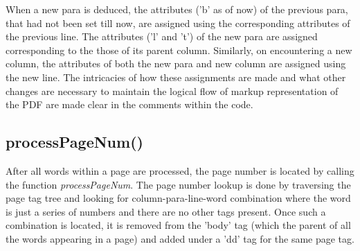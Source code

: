 When a new para is deduced, the attributes ('b' as of now) of the previous para, that had not been set till now, are assigned using the corresponding attributes of the previous line.
The attributes ('l' and 't') of the new para are assigned corresponding to the those of its parent column.
Similarly, on encountering a new column, the attributes of both the new para and new column are assigned using the new line.
The intricacies of how these assignments are made and what other changes are necessary to maintain the logical flow of markup representation of the PDF are made clear in the comments within the code.

\subsection{processPageNum()}
After all words within a page are processed, the page number is located by calling the function \emph{processPageNum}.
The page number lookup is done by traversing the page tag tree and looking for column-para-line-word combination where the word is just a series of numbers and there are no other tags present.
Once such a combination is located, it is removed from the 'body' tag (which the parent of all the words appearing in a page) and added under a 'dd' tag for the same page tag.
